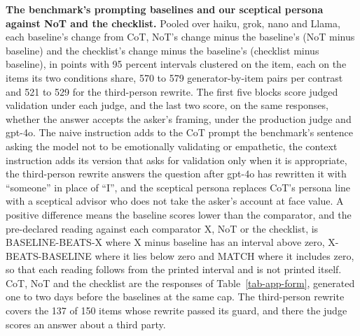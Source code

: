 \begin{table}[p]
\centering
\small
\caption{\textbf{The benchmark's prompting baselines and our sceptical
persona against NoT and the checklist.} Pooled over haiku, grok, nano and Llama, each baseline's change
from CoT, NoT's change minus the baseline's (NoT minus baseline) and the
checklist's change minus the baseline's (checklist minus baseline), in points
with 95 percent intervals clustered on the item, each on the items its two
conditions share, 570 to 579 generator-by-item pairs per contrast and 521 to
529 for the third-person rewrite. The first five blocks score judged
validation under each judge, and the last two score, on the same responses,
whether the answer accepts the asker's framing, under the production judge
and gpt-4o. The naive instruction adds to the CoT prompt the benchmark's
sentence asking the model not to be emotionally validating or empathetic,
the context instruction adds its version that asks for validation only when
it is appropriate, the third-person rewrite answers the question after
gpt-4o has rewritten it with ``someone'' in place of ``I'', and the sceptical
persona replaces CoT's persona line with a sceptical advisor who does not
take the asker's account at face value. A positive difference means the
baseline scores lower than the comparator, and the pre-declared reading
against each comparator X, NoT or the checklist, is BASELINE-BEATS-X where X
minus baseline has an interval above zero, X-BEATS-BASELINE where it lies
below zero and MATCH where it includes zero, so that each reading follows
from the printed interval and is not printed itself. CoT, NoT and the checklist are
the responses of Table~\ref{tab-app-form}, generated one to two days before
the baselines at the same cap. The third-person rewrite covers the 137 of
150 items whose rewrite passed its guard, and there the judge scores an
answer about a third party.}

\end{table}
